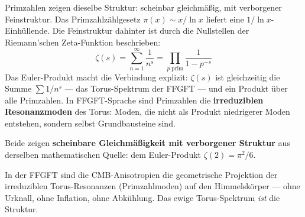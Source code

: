 Primzahlen zeigen dieselbe Struktur: scheinbar gleichmäßig, mit verborgener
Feinstruktur. Das Primzahlzählgesetz $\pi(x) \sim x/\ln x$ liefert eine
$1/\ln x$-Einhüllende. Die Feinstruktur dahinter ist durch die Nullstellen
der Riemann'schen Zeta-Funktion beschrieben:
\begin{equation}
    \zeta(s) = \sum_{n=1}^{\infty} \frac{1}{n^s}
    = \prod_{p\;\text{prim}} \frac{1}{1-p^{-s}}
\end{equation}
Das Euler-Produkt macht die Verbindung explizit: $\zeta(s)$ ist gleichzeitig
die Summe $\sum 1/n^s$ — das Torus-Spektrum der FFGFT — und ein Produkt
über alle Primzahlen. In FFGFT-Sprache sind Primzahlen die
\textbf{irreduziblen Resonanzmoden} des Torus: Moden, die nicht als
Produkt niedrigerer Moden entstehen, sondern selbst Grundbausteine sind.

\begin{interpretation}
Beide zeigen \textbf{scheinbare Gleichmäßigkeit mit verborgener Struktur}
aus derselben mathematischen Quelle: dem Euler-Produkt $\zeta(2) = \pi^2/6$.

In der FFGFT sind die CMB-Anisotropien die geometrische Projektion der
irreduziblen Torus-Resonanzen (Primzahlmoden) auf den Himmelskörper —
ohne Urknall, ohne Inflation, ohne Abkühlung. Das ewige Torus-Spektrum
\emph{ist} die Struktur.
\end{interpretation}

\begin{table}[ht]
\centering
{}
\caption{Primzahlen und CMB-Anisotropien als Instanzen desselben ewigen Spektrums}
\end{table}

